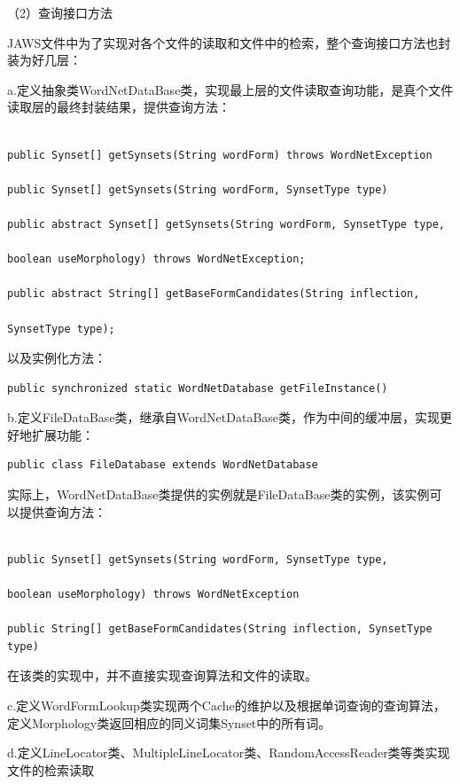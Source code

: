 \documentclass[a4paper,unicode=true,xetex]{article}
\begin{document}
（2）查询接口方法

JAWS文件中为了实现对各个文件的读取和文件中的检索，整个查询接口方法也封装为好几层：

a.定义抽象类WordNetDataBase类，实现最上层的文件读取查询功能，是真个文件读取层的最终封装结果，提供查询方法：
\begin{lstlisting}

public Synset[] getSynsets(String wordForm) throws WordNetException

public Synset[] getSynsets(String wordForm, SynsetType type)

public abstract Synset[] getSynsets(String wordForm, SynsetType type,

boolean useMorphology) throws WordNetException;

public abstract String[] getBaseFormCandidates(String inflection,

SynsetType type);

\end{lstlisting}
以及实例化方法：

\begin{lstlisting}
public synchronized static WordNetDatabase getFileInstance()
\end{lstlisting}

b.定义FileDataBase类，继承自WordNetDataBase类，作为中间的缓冲层，实现更好地扩展功能：

\begin{lstlisting}
public class FileDatabase extends WordNetDatabase
\end{lstlisting}

实际上，WordNetDataBase类提供的实例就是FileDataBase类的实例，该实例可以提供查询方法：

\begin{lstlisting}

public Synset[] getSynsets(String wordForm, SynsetType type,

boolean useMorphology) throws WordNetException

public String[] getBaseFormCandidates(String inflection, SynsetType type)

\end{lstlisting}
在该类的实现中，并不直接实现查询算法和文件的读取。

c.定义WordFormLookup类实现两个Cache的维护以及根据单词查询的查询算法，定义Morphology类返回相应的同义词集Synset中的所有词。

d.定义LineLocator类、MultipleLineLocator类、RandomAccessReader类等类实现文件的检索读取
\end{document}
